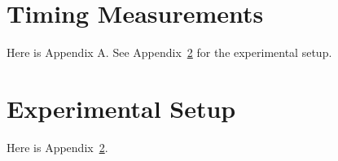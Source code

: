 \documentclass[proposal]{bsu-ms}
\begin{document}
%
%


\appendix


\chapter{Timing Measurements}\label{app:Timing}

Here is Appendix A. See Appendix~\ref{app:Setup} for the experimental setup.


\chapter{Experimental Setup}\label{app:Setup}

Here is Appendix~\ref{app:Setup}.


\finish  %
\end{document}
